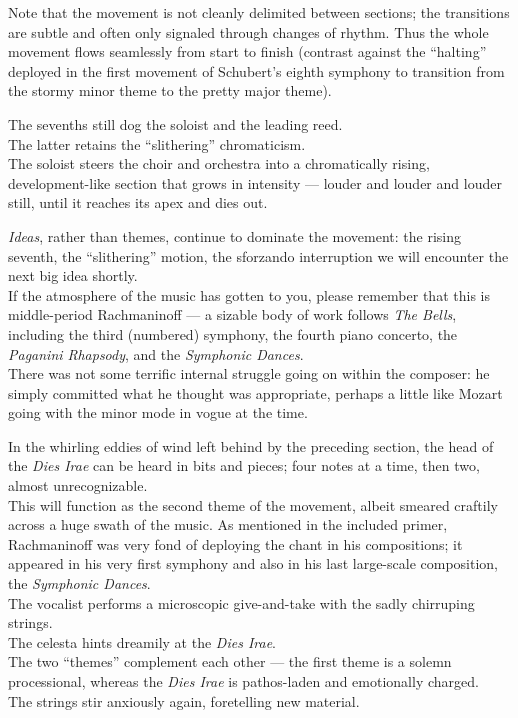 \documentclass{beamer}
\begin{document}
\begin{frame}
  Note that the movement is not cleanly delimited between sections; the transitions are subtle and often only signaled through changes of rhythm. Thus the whole movement flows seamlessly from start to finish (contrast against the ``halting'' deployed in the first movement of Schubert's eighth symphony to transition from the stormy minor theme to the pretty major theme). 
\end{frame} 

\begin{frame}
  The sevenths still dog the soloist and the leading reed. 
  \pause \\ 
  The latter retains the ``slithering'' chromaticism. 
  \pause \\ 
  The soloist steers the choir and orchestra into a chromatically rising, development-like section that grows in intensity --- louder and louder and louder still, until it reaches its apex and dies out. 
\end{frame} 

\begin{frame} 
  \emph{Ideas}, rather than themes, continue to dominate the movement: the rising seventh, the ``slithering'' motion, the sforzando interruption \textellipsis we will encounter the next big idea shortly. 
  \pause \\ 
  If the atmosphere of the music has gotten to you, please remember that this is middle-period Rachmaninoff --- a sizable body of work follows \textit{The Bells}, including the third (numbered) symphony, the fourth piano concerto, the \textit{Paganini Rhapsody}, and the \textit{Symphonic Dances}. 
  \pause \\ 
  There was not some terrific internal struggle going on within the composer: he simply committed what he thought was appropriate, perhaps a little like Mozart going with the minor mode in vogue at the time. 
\end{frame} 

\begin{frame}
  In the whirling eddies of wind left behind by the preceding section, the head of the \textit{Dies Irae} can be heard in bits and pieces; \pause four notes at a time, \pause then two, almost unrecognizable. 
  \pause \\
  This will function as the second theme of the movement, albeit smeared craftily across a huge swath of the music. As mentioned in the included primer, Rachmaninoff was very fond of deploying the chant in his compositions; it appeared in his very first symphony and also in his last large-scale composition, the \textit{Symphonic Dances}. 
  \pause \\ 
  The vocalist performs a microscopic give-and-take with the sadly chirruping strings. 
  \pause \\ 
  The celesta hints dreamily at the \textit{Dies Irae}. 
  \pause \\ 
  The two ``themes'' complement each other --- the first theme is a solemn processional, whereas the \textit{Dies Irae} is pathos-laden and emotionally charged. 
  \pause \\ 
  The strings stir anxiously again, foretelling new material. 
\end{frame} 
\end{document}
